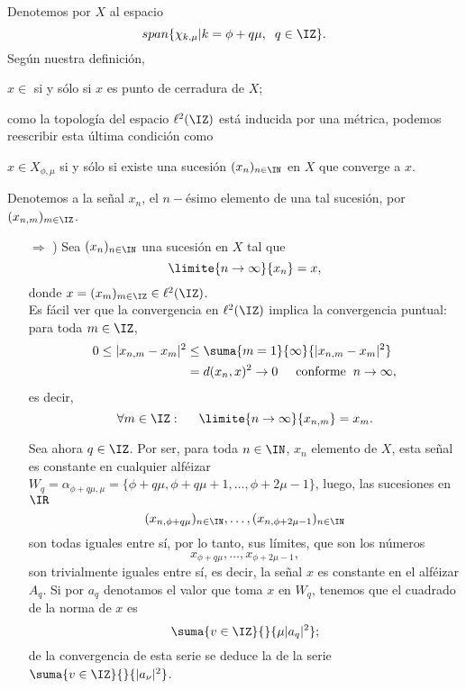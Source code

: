 \begin{dem} Denotemos por $X$ al espacio
\[
span \{ \chi_{k, \mu} | k= \phi + q \mu, 
\hspace{0.2cm} q \in \IZ \}.
\]
Según nuestra definición,
\begin{center}
$x \in $ si y sólo si $x$ es punto
de cerradura de $X$;
\end{center}

\noindent
como la topología del espacio $\ell^{2}(\IZ)$
está inducida por una métrica, podemos reescribir esta
última condición como

\begin{center}
$x \in X_{\phi, \mu}$ si y sólo si existe una sucesión $(x_{n})_{n \in \IN}$
en $X$ que converge a $x$.
\end{center}
\noindent 
Denotemos a la señal $x_{n}$, el $n-$ésimo elemento de una tal
sucesión, por $(x_{n,m})_{m \in \IZ}$.

\begin{itemize}
\item[$\Rightarrow$ )] Sea $(x_{n})_{n \in \IN}$ una sucesión
en $X$ tal que 
\[
\limite{n \rightarrow \infty}{x_{n}}=x,
\]
donde $x=(x_{m})_{m \in \IZ} \in \ell^{2}(\IZ)$. \\
Es fácil ver que la convergencia en $\ell^{2}(\IZ)$
implica la convergencia puntual: para toda $m \in \IZ$,
\begin{align*}
0 \leq |x_{n,m}-x_{m}|^{2}  &\leq \suma{m=1}{\infty}{|x_{n,m}-x_{m}|^{2}} \\
& =d(x_{n},x)^{2} \rightarrow 0 \hspace{0.5cm} \text{conforme}
\hspace{0.2cm} n \rightarrow \infty,
\end{align*}
es decir,
\[
\forall m \in \IZ: \hspace{0.5cm} \limite{n \rightarrow \infty}{x_{n,m}}=x_{m}.
\]

Sea ahora $q \in \IZ$. 
Por ser, para toda $n \in \IN$, $x_{n}$ elemento de $X$, esta señal
es constante en cualquier alféizar
$W_{q}=\alpha_{\phi + q \mu , \mu}= \{ \phi+q \mu,\phi+q \mu+1,\ldots ,\phi +2\mu -1 \} $,
luego, las sucesiones en $\IR$
\[
(x_{n, \phi + q\mu})_{n \in \IN}, \ldots , (x_{n, \phi + 2\mu-1})_{n \in \IN}
\]
son todas iguales entre sí, por lo tanto, sus límites, que
son los números
\[
x_{\phi + q \mu}, \ldots , x_{\phi +2\mu -1},
\]
son trivialmente iguales entre sí, es decir, la señal $x$
es constante en el alféizar $A_{q}$. Si por $a_{q}$
denotamos el valor que toma $x$ en $W_{q}$,
tenemos que el cuadrado de la norma de $x$ es
\[
\suma{v \in \IZ}{}{\mu |a_{q}|^{2}};
\]
de la convergencia de esta serie se deduce la de
la serie $\suma{v \in \IZ}{}{|a_{\nu}|^{2}}$.


\end{itemize}
\end{dem}

